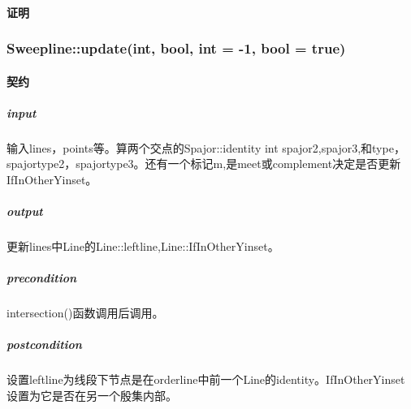 \documentclass[a4paper]{book}
\numberwithin{equation}{chapter}
\theoremstyle{definition}
\begin{document}
\paragraph{证明}

\subsubsection{Sweepline::update(int, bool, int = -1, bool = true)}
\paragraph{契约}
\subparagraph{input}
输入lines，points等。算两个交点的Spajor::identity int spajor2,spajor3,和type，spajortype2，spajortype3。还有一个标记m,是meet或complement决定是否更新IfInOtherYinset。
\subparagraph{output}
更新lines中Line的Line::leftline,Line::IfInOtherYinset。
\subparagraph{precondition}
intersection()函数调用后调用。
\subparagraph{postcondition}
设置leftline为线段下节点是在orderline中前一个Line的identity。IfInOtherYinset设置为它是否在另一个殷集内部。
\end{document}
